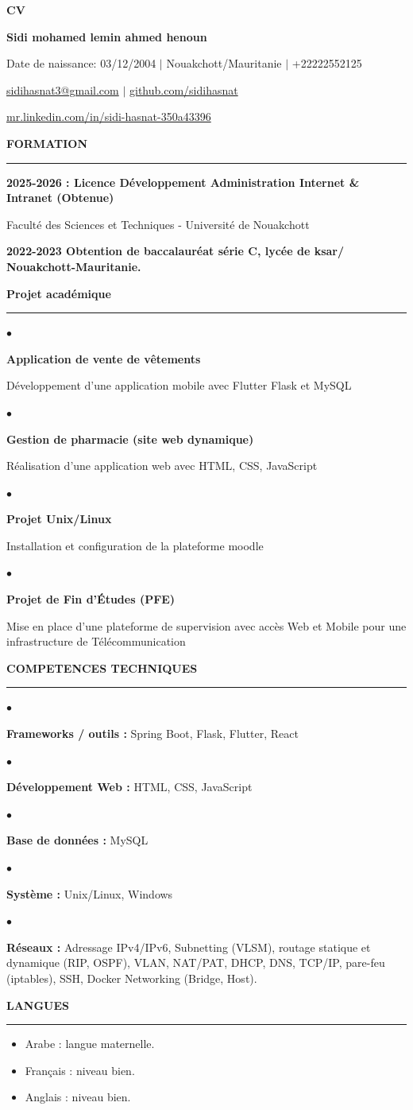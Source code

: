 \documentclass[10.5pt,a4paper]{article}
\newcommand{\cvsection}[1]{%
  \vspace{0.46cm}%
  {\large\bfseries\color{accent} #1}\par
  \vspace{0.08cm}%
  {\color{accent}\rule{\textwidth}{0.75pt}}\par
  \vspace{0.16cm}%
}
\newcommand{\project}[2]{%
  \begin{minipage}[t]{0.025\textwidth}\color{accent}\large$\bullet$\end{minipage}%
  \begin{minipage}[t]{0.955\textwidth}
    {\bfseries #1}\par
    \vspace{0.03cm}#2
  \end{minipage}\par\vspace{0.11cm}
}
\newcommand{\skill}[2]{%
  \begin{minipage}[t]{0.025\textwidth}\color{accent}\large$\bullet$\end{minipage}%
  \begin{minipage}[t]{0.955\textwidth}
    {\bfseries #1} #2
  \end{minipage}\par\vspace{0.07cm}
}
\begin{document}
\color{textgray}

\begin{center}
  {\fontsize{26}{29}\selectfont\bfseries\color{accent} CV}\par
  \vspace{0.22cm}
  {\fontsize{16}{19}\selectfont\bfseries Sidi mohamed lemin ahmed henoun}\par
  \vspace{0.18cm}
  {\small Date de naissance: 03/12/2004 \quad $\vert$ \quad Nouakchott/Mauritanie \quad $\vert$ \quad +22222552125}\par
  \vspace{0.07cm}
  {\small \href{mailto:sidihasnat3@gmail.com}{sidihasnat3@gmail.com} \quad $\vert$ \quad
  \href{https://github.com/sidihasnat}{github.com/sidihasnat}}\par
  \vspace{0.07cm}
  {\small \href{https://mr.linkedin.com/in/sidi-hasnat-350a43396}{mr.linkedin.com/in/sidi-hasnat-350a43396}}\par
\end{center}

\cvsection{FORMATION}
{\bfseries 2025-2026 : Licence Développement Administration Internet \& Intranet (Obtenue)}\par
\vspace{0.08cm}
Faculté des Sciences et Techniques - Université de Nouakchott\par
\vspace{0.08cm}
{\bfseries 2022-2023 Obtention de baccalauréat série C, lycée de ksar/ Nouakchott-Mauritanie.}

\cvsection{Projet académique}
\project{Application de vente de vêtements}{Développement d’une application mobile avec Flutter Flask et MySQL}
\project{Gestion de pharmacie (site web dynamique)}{Réalisation d’une application web avec HTML, CSS, JavaScript}
\project{Projet Unix/Linux}{Installation et configuration de la plateforme moodle}
\project{Projet de Fin d'Études (PFE)}{Mise en place d’une plateforme de supervision avec accès Web et Mobile pour une infrastructure de Télécommunication}

\cvsection{COMPETENCES TECHNIQUES}
\skill{Frameworks / outils :}{Spring Boot, Flask, Flutter, React}

\skill{Développement Web :}{HTML, CSS, JavaScript}

\skill{Base de données :}{MySQL}

\skill{Système :}{Unix/Linux, Windows}

\skill{Réseaux :}{Adressage IPv4/IPv6, Subnetting (VLSM), routage statique et dynamique (RIP, OSPF), VLAN, NAT/PAT, DHCP, DNS, TCP/IP, pare-feu (iptables), SSH, Docker Networking (Bridge, Host).}
\cvsection{LANGUES}
\begin{itemize}[leftmargin=0.65cm,itemsep=0.06cm,topsep=0.03cm,label=\textcolor{accent}{$\bullet$}]
  \item Arabe : langue maternelle.
  \item Français : niveau bien.
  \item Anglais : niveau bien.
\end{itemize}
\end{document}
